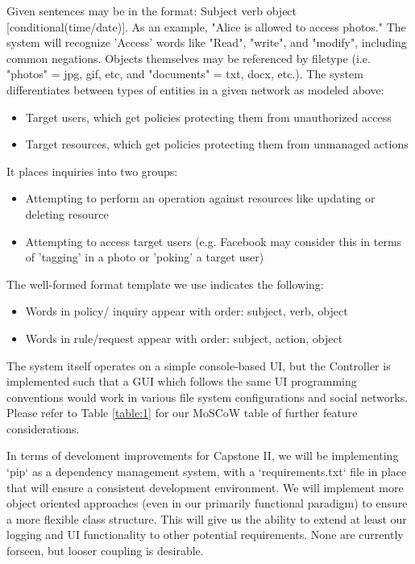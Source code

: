 \documentclass[12pt]{article}
\begin{document}
Given sentences may be in the format: Subject verb object [conditional(time/date)]. As an example, "Alice is allowed to access photos."
The system will recognize 'Access' words like "Read", "write", and "modify", including common negations. Objects themselves may be referenced by filetype (i.e. "photos" = jpg, gif, etc, and "documents" = txt, docx, etc.). The system differentiates between types of entities in a given network as modeled above:
\begin{itemize}
    \item Target users, which get policies protecting them from unauthorized access
    \item Target resources, which get policies protecting them from unmanaged actions
\end{itemize}
It places inquiries into two groups:
\begin{itemize}
    \item Attempting to perform an operation against resources like updating or deleting resource
    \item Attempting to access target users (e.g. Facebook may consider this in terms of 'tagging' in a photo or 'poking' a target user)
\end{itemize}
The well-formed format template we use indicates the following:
\begin{itemize}
    \item Words in policy/ inquiry appear with order: subject, verb, object
    \item Words in rule/request appear with order: subject, action, object
\end{itemize}

The system itself operates on a simple console-based UI, but the Controller is implemented such that a GUI which follows the same UI programming conventions would work in various file system configurations and social networks. Please refer to Table \ref{table:1} for our MoSCoW table of further feature considerations.

In terms of develoment improvements for Capstone II, we will be implementing `pip` as a dependency management system, with a `requirements.txt` file in place that will ensure a consistent development environment. We will implement more object oriented approaches (even in our primarily functional paradigm) to ensure a more flexible class structure. This will give us the ability to extend at least our logging and UI functionality to other potential requirements. None are currently forseen, but looser coupling is desirable.
\end{document}
